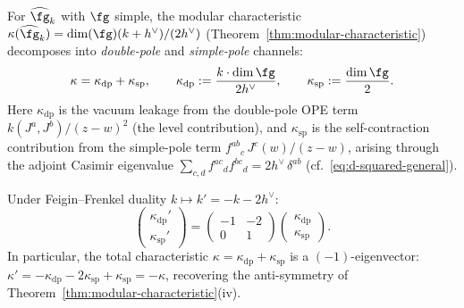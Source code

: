 \begin{definition}\label{def:channel-decomposition}
For $\widehat{\fg}_k$ with $\fg$ simple, the modular
characteristic $\kappa(\widehat{\fg}_k) =
\dim(\fg)(k + h^\vee)/(2h^\vee)$
(Theorem~\ref{thm:modular-characteristic}) decomposes into
\emph{double-pole} and \emph{simple-pole} channels:
\begin{equation}\label{eq:kappa-dp-sp}
\kappa = \kappa_{\mathrm{dp}} + \kappa_{\mathrm{sp}},
\qquad
\kappa_{\mathrm{dp}}
:= \frac{k \cdot \dim\fg}{2h^\vee},
\qquad
\kappa_{\mathrm{sp}}
:= \frac{\dim\fg}{2}.
\end{equation}
Here $\kappa_{\mathrm{dp}}$ is the vacuum leakage from the
double-pole OPE term $k(J^a, J^b)/(z-w)^2$ (the level
contribution), and $\kappa_{\mathrm{sp}}$ is the self-contraction
contribution from the simple-pole term
$f^{ab}{}_{c}\,J^c(w)/(z-w)$, arising through the adjoint
Casimir eigenvalue
$\sum_{c,d} f^{ac}{}_d f^{bc}{}_d = 2h^\vee\,\delta^{ab}$
(cf.~\eqref{eq:d-squared-general}).
\end{definition}

\begin{proposition}
\label{prop:ff-channel-shear}
Under Feigin--Frenkel duality $k \mapsto k' = -k - 2h^\vee$:
\begin{equation}\label{eq:ff-shear}
\begin{pmatrix} \kappa_{\mathrm{dp}}' \\
\kappa_{\mathrm{sp}}' \end{pmatrix}
=
\begin{pmatrix} -1 & -2 \\ 0 & 1 \end{pmatrix}
\begin{pmatrix} \kappa_{\mathrm{dp}} \\
\kappa_{\mathrm{sp}} \end{pmatrix}.
\end{equation}
In particular, the total characteristic
$\kappa = \kappa_{\mathrm{dp}} + \kappa_{\mathrm{sp}}$
is a $(-1)$-eigenvector:
$\kappa' = -\kappa_{\mathrm{dp}} - 2\kappa_{\mathrm{sp}}
+ \kappa_{\mathrm{sp}} = -\kappa$,
recovering the anti-symmetry of
Theorem~\textup{\ref{thm:modular-characteristic}}(iv).
\end{proposition}

